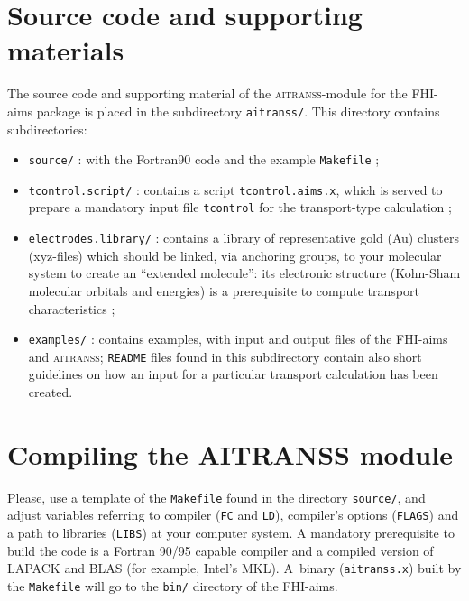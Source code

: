 
\section{Source code and supporting materials} 
\label{sec:aitranss:source}

The source code and supporting material of the \textsc{aitranss}-module
for the FHI-aims package is placed in the subdirectory \verb,aitranss/,.
This directory contains subdirectories:

\begin{itemize}
 \item \verb,source/, : with the Fortran90 code and the example
   \verb,Makefile, ; 
 \item \verb,tcontrol.script/, : contains a script
 \verb,tcontrol.aims.x,,
   which is served to prepare a mandatory input file \verb,tcontrol,
   for the transport-type calculation ;
 \item \verb,electrodes.library/, : contains a library of representative
   gold (Au) clusters
   (xyz-files) which should be linked, via anchoring groups, to your
   molecular system to create an ``extended molecule'': its electronic
   structure (Kohn-Sham molecular orbitals and energies) is a prerequisite
   to compute transport characteristics ;
 \item \verb,examples/, : contains examples, with input and output
   files of the FHI-aims and \textsc{aitranss}; \verb,README, files
   found in this subdirectory contain also short guidelines on how an
   input for a particular transport calculation has been created.
\end{itemize}

\section[Compiling the \textsc{aitranss} module]%
{Compiling the {\large AITRANSS} module}
\label{sec:aitranss:compiling}

Please, use a template of the \verb,Makefile, found in the directory
\verb,source/,, and adjust variables referring to compiler (\verb,FC,
and \verb,LD,), compiler's options (\verb,FLAGS,) and a path to libraries
(\verb,LIBS,) at your computer system.  A mandatory prerequisite to build 
the code is a Fortran 90/95 capable compiler and a compiled version of 
{\small{LAPACK}} and {\small{BLAS}} (for example, Intel's {\small{MKL}}). 
A~binary (\verb,aitranss.x,) built by the \verb,Makefile, will go to the 
\verb,bin/, directory of the FHI-aims.


